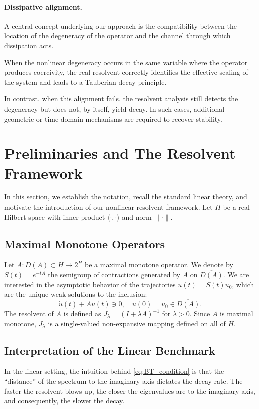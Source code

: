 \documentclass[11pt,reqno]{amsart}
\theoremstyle{remark}
\begin{document}
\paragraph{\bf Dissipative alignment.}
\medskip
A central concept underlying our approach is the compatibility between the
location of the degeneracy of the operator and the channel through which
dissipation acts.

When the nonlinear degeneracy occurs in the same variable where the operator
produces coercivity, the real resolvent correctly identifies the effective
scaling of the system and leads to a Tauberian decay principle.

In contrast, when this alignment fails, the resolvent analysis still detects
the degeneracy but does not, by itself, yield decay. In such cases, additional
geometric or time-domain mechanisms are required to recover stability.


\section{Preliminaries and The Resolvent Framework}
\label{sec:preliminaries}

In this section, we establish the notation, recall the standard linear theory, and motivate the introduction of our nonlinear resolvent framework. Let $H$ be a real Hilbert space with inner product $\langle \cdot, \cdot \rangle$ and norm $\|\cdot\|$.

\subsection{Maximal Monotone Operators}
Let $A: D(A) \subset H \to 2^H$ be a maximal monotone operator. We denote by $S(t) = e^{-tA}$ the semigroup of contractions generated by $A$ on $\overline{D(A)}$.
We are interested in the asymptotic behavior of the trajectories $u(t) = S(t)u_0$, which are the unique weak solutions to the inclusion:
\begin{equation}\label{eq:evolution}
    \dot{u}(t) + Au(t) \ni 0, \quad u(0) = u_0 \in \overline{D(A)}.
\end{equation}
The resolvent of $A$ is defined as $J_\lambda = (I + \lambda A)^{-1}$ for $\lambda > 0$. Since $A$ is maximal monotone, $J_\lambda$ is a single-valued non-expansive mapping defined on all of $H$.

\subsection{Interpretation of the Linear Benchmark}
In the linear setting, the intuition behind \eqref{eq:BT_condition} is that the ``distance'' of the spectrum to the imaginary axis dictates the decay rate. The faster the resolvent blows up, the closer the eigenvalues are to the imaginary axis, and consequently, the slower the decay.
\end{document}
